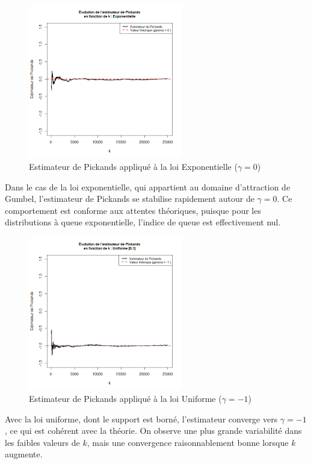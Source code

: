 \documentclass{article}
\theoremstyle{plain}
\theoremstyle{definition}
\theoremstyle{plain}
\begin{document}
\begin{figure}[H]
    \centering
    \includegraphics[width=0.6\textwidth]{./Evolution des estimateurs/pickands/estimateur_pickands_exponentielle.png}
    \caption{Estimateur de Pickands appliqué à la loi Exponentielle ($\gamma = 0$)}
\end{figure}
\noindent Dans le cas de la loi exponentielle, qui appartient au domaine d'attraction de Gumbel, l’estimateur de Pickands se stabilise rapidement autour de \(\gamma = 0\). Ce comportement est conforme aux attentes théoriques, puisque pour les distributions à queue exponentielle, l’indice de queue est effectivement nul.

\begin{figure}[H]
    \centering
    \includegraphics[width=0.6\textwidth]{./Evolution des estimateurs/pickands/estimateur_pickands_uniforme.png}
    \caption{Estimateur de Pickands appliqué à la loi Uniforme ($\gamma = -1$)}
\end{figure}
\noindent Avec la loi uniforme, dont le support est borné, l’estimateur converge vers $\gamma = -1$, ce qui est cohérent avec la théorie. On observe une plus grande variabilité dans les faibles valeurs de $k$, mais une convergence raisonnablement bonne lorsque $k$ augmente.
\end{document}
